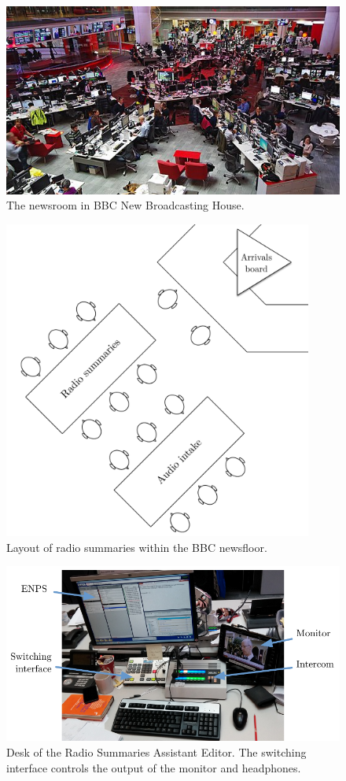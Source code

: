 \begin{figure}
  \centering
  \includegraphics[width=\columnwidth]{figs/newsroom.jpg}
  \caption{The newsroom in BBC New Broadcasting House.}
  \label{fig:newsroom}
\end{figure}

\begin{figure}
	\centering
	\includegraphics[width=4in]{figs/news-layout.pdf}
  \caption{Layout of radio summaries within the BBC newsfloor.}
	\label{fig:newsroom-layout}
\end{figure}

\begin{figure}
  \centering
  \includegraphics[width=\columnwidth]{figs/news-desk-labelled.pdf}
  \caption{Desk of the Radio Summaries Assistant Editor. The switching interface controls the output of the monitor and
    headphones.}
  \label{fig:news-desktop}
\end{figure}

